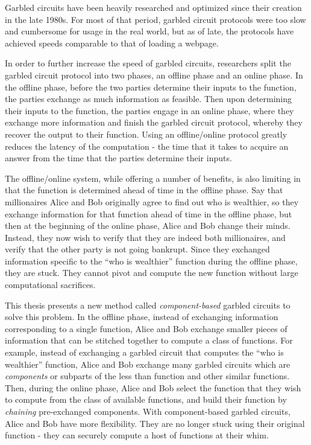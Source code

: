 Garbled circuits have been heavily researched and optimized since their creation in the late 1980s.
For most of that period, garbled circuit protocols were too slow and cumbersome for usage in the real world, but as of late, the protocols have achieved speeds comparable to that of loading a webpage. 

In order to further increase the speed of garbled circuits, researchers split the garbled circuit protocol into two phases, an offline phase and an online phase.
In the offline phase, before the two parties determine their inputs to the function, the parties exchange as much information as feasible. 
Then upon determining their inputs to the function, the parties engage in an online phase, where they exchange more information and finish the garbled circuit protocol, whereby they recover the output to their function.
Using an offline/online protocol greatly reduces the latency of the computation - the time that it takes to acquire an answer from the time that the parties determine their inputs.

The offline/online system, while offering a number of benefits, is also limiting in that the function is determined ahead of time in the offline phase.
Say that millionaires Alice and Bob originally agree to find out who is wealthier, so they exchange information for that function ahead of time in the offline phase, but then at the beginning of the online phase, Alice and Bob change their minds. 
Instead, they now wish to verify that they are indeed both millionaires, and verify that the other party is not going bankrupt.
Since they exchanged information specific to the ``who is wealthier'' function during the offline phase, they are stuck. 
They cannot pivot and compute the new function without large computational sacrifices.

This thesis presents a new method called \textit{component-based} garbled circuits to solve this problem.
In the offline phase, instead of exchanging information corresponding to a single function, Alice and Bob exchange smaller pieces of information that can be stitched together to compute a class of functions.
For example, instead of exchanging a garbled circuit that computes the ``who is wealthier'' function, Alice and Bob exchange many garbled circuits which are \textit{components} or subparts of the less than function and other similar functions.
Then, during the online phase, Alice and Bob select the function that they wish to compute from the class of available functions, and build their function by \textit{chaining} pre-exchanged components.
With component-based garbled circuits, Alice and Bob have more flexibility. 
They are no longer stuck using their original function - they can securely compute a host of functions at their whim. 

